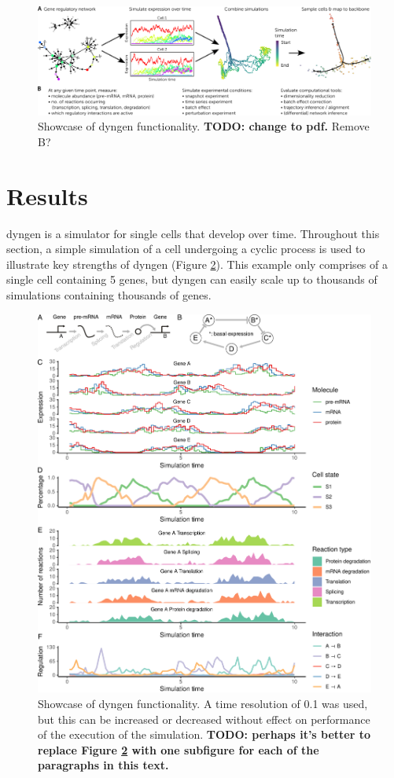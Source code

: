 \begin{figure}[htb!]
	\centering
	\includegraphics[width=\linewidth]{fig/showcase_3.png} 
	\caption{Showcase of dyngen functionality. \textbf{TODO: change to pdf.} Remove B?} %
	\label{fig:dyngen}
\end{figure}

\section{Results}
dyngen is a simulator for single cells that develop over time. Throughout this section, a simple simulation of a cell undergoing a cyclic process is used to illustrate key strengths of dyngen (Figure \ref{fig:simplecyclic}). This example only comprises of a single cell containing 5 genes, but dyngen can easily scale up to thousands of simulations containing thousands of genes.

\begin{figure}[htb!]
	\centering
	\includegraphics[width=\linewidth]{fig/simplecyclic_edited} 
	\caption{Showcase of dyngen functionality. A time resolution of 0.1 was used, but this can be increased or decreased without effect on performance of the execution of the simulation. \textbf{TODO: perhaps it's better to replace Figure \ref{fig:simplecyclic} with one subfigure for each of the paragraphs in this text.}}
	\label{fig:simplecyclic}
\end{figure}

